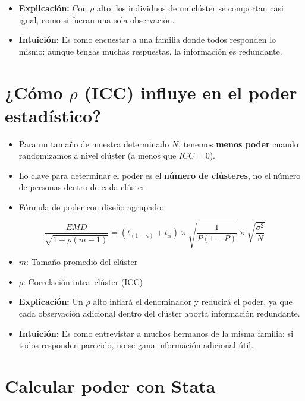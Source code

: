 \documentclass[12pt]{article}
\begin{document}
\begin{itemize}
    \item \textbf{Explicación:} Con $\rho$ alto, los individuos de un clúster se comportan casi igual, como si fueran una sola observación.
    \item \textbf{Intuición:} Es como encuestar a una familia donde todos responden lo mismo: aunque tengas muchas respuestas, la información es redundante.
\end{itemize}

\section*{\noindent\textbf{¿Cómo $\rho$ (ICC) influye en el poder estadístico?}}

\begin{itemize}
    \item Para un tamaño de muestra determinado $N$, tenemos \textbf{menos poder} cuando randomizamos a nivel clúster (a menos que $ICC = 0$).
    \item Lo clave para determinar el poder es el \textbf{número de clústeres}, no el número de personas dentro de cada clúster.
    \item Fórmula de poder con diseño agrupado:
\end{itemize}

\[
\frac{EMD}{\sqrt{1 + \rho (m-1)}} 
= \left( t_{(1-\kappa)} + t_{\alpha} \right) 
\times \sqrt{\frac{1}{P(1-P)}} \times \sqrt{\frac{\sigma^2}{N}}
\]

\begin{itemize}
    \item $m$: Tamaño promedio del clúster
    \item $\rho$: Correlación intra–clúster (ICC)
\end{itemize}

\begin{itemize}
    \item \textbf{Explicación:} Un $\rho$ alto inflará el denominador y reducirá el poder, ya que cada observación adicional dentro del clúster aporta información redundante.
    \item \textbf{Intuición:} Es como entrevistar a muchos hermanos de la misma familia: si todos responden parecido, no se gana información adicional útil.
\end{itemize}

\section*{\noindent\textbf{Calcular poder con Stata}}
\end{document}
